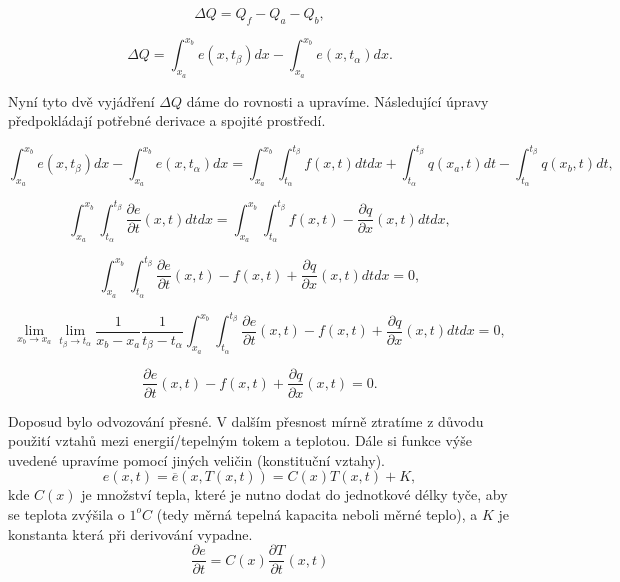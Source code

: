 \documentclass[a4]{report}
\theoremstyle{definition}
\begin{document}
\begin{equation}
\Delta Q = Q_f - Q_a -Q_b, 
\end{equation}

\begin{equation}
\Delta Q =\int_{x_a}^{x_b} e(x,t_\beta) dx    -\int_{x_a}^{x_b}  e(x,t_\alpha)dx. 
\end{equation}

Nyní tyto dvě vyjádření $\Delta Q$ dáme do rovnosti a upravíme. Následující úpravy předpokládají potřebné derivace a spojité prostředí.

\begin{equation}
\int_{x_a}^{x_b} e(x,t_\beta)dx-\int_{x_a}^{x_b}  e(x,t_\alpha)dx= \int_{x_a}^{x_b} \int_{t_\alpha}^{t_\beta} f(x,t) dt dx+\int_{t_\alpha}^{t_\beta} q(x_a,t) dt-\int_{t_\alpha}^{t_\beta} q(x_b,t) dt, 
\end{equation}

\begin{equation}
\int_{x_a}^{x_b} \int_{t_\alpha}^{t_\beta} \frac{\partial e}{\partial t} (x,t) dt
dx= \int_{x_a}^{x_b} \int_{t_\alpha}^{t_\beta} f(x,t)-\frac{\partial q}{\partial x} (x,t)dt dx,
\end{equation}

\begin{equation}
\int_{x_a}^{x_b} \int_{t_\alpha}^{t_\beta} \frac{\partial e}{\partial t}(x,t)-f(x,t)+\frac{\partial q}{\partial x} (x,t) dt dx=0 ,
\end{equation}

\begin{equation}
\lim_{x_b\rightarrow x_a} \lim_{t_\beta \rightarrow t_\alpha} \frac{1}{x_b-x_a}\frac{1}{t_\beta-t_\alpha}\int_{x_a}^{x_b} \int_{t_\alpha}^{t_\beta} \frac{\partial e}{\partial t}(x,t)-f(x,t)+\frac{\partial q}{\partial x} (x,t) dt
dx=0 ,
\end{equation}

\begin{equation}    
\frac{\partial e}{\partial t}(x,t)-f(x,t)+\frac{\partial q}{\partial x} (x,t)=0.\label{hxbwkuehbkuwhfcuwkbfwhck} \end{equation}

Doposud bylo odvozování přesné. V dalším přesnost mírně ztratíme z důvodu použití vztahů mezi energií/tepelným tokem a teplotou. 
Dále si funkce výše uvedené upravíme pomocí jiných veličin (konstituční vztahy).
\begin{equation}
e(x,t)=\overline{e}(x,T(x,t))=C(x)T(x,t)+K,
\end{equation}
kde $C(x)$ je množství tepla, které je nutno dodat do jednotkové délky tyče, aby se teplota zvýšila o $1^o C$ (tedy měrná tepelná kapacita neboli měrné teplo), a $K$ je konstanta která při derivování vypadne.
\begin{equation}
\frac{\partial e}{\partial t}=C(x) \frac{\partial T}{\partial t}(x,t)
\end{equation}
\end{document}
